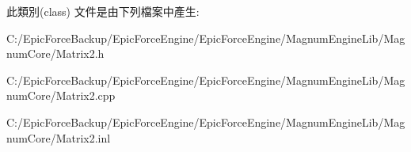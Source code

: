 此類別(class) 文件是由下列檔案中產生\+:\begin{DoxyCompactItemize}
\item 
C\+:/\+Epic\+Force\+Backup/\+Epic\+Force\+Engine/\+Epic\+Force\+Engine/\+Magnum\+Engine\+Lib/\+Magnum\+Core/Matrix2.\+h\item 
C\+:/\+Epic\+Force\+Backup/\+Epic\+Force\+Engine/\+Epic\+Force\+Engine/\+Magnum\+Engine\+Lib/\+Magnum\+Core/Matrix2.\+cpp\item 
C\+:/\+Epic\+Force\+Backup/\+Epic\+Force\+Engine/\+Epic\+Force\+Engine/\+Magnum\+Engine\+Lib/\+Magnum\+Core/Matrix2.\+inl\end{DoxyCompactItemize}
